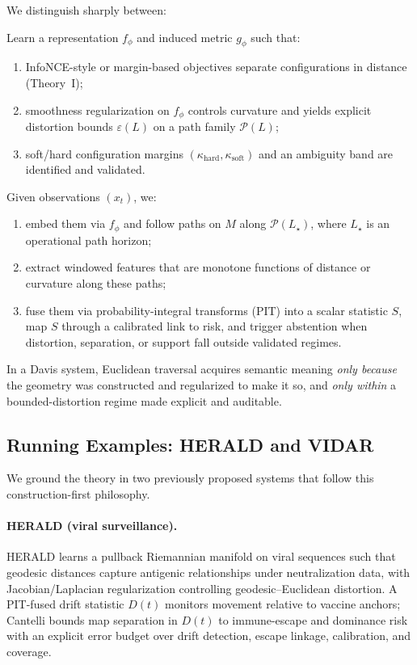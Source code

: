 \documentclass[11pt]{article}
\theoremstyle{remark}
\theoremstyle{plain}
\begin{document}
We distinguish sharply between:
\begin{description}[leftmargin=*,labelsep=0.6em]
    \item[Construction (training time).] Learn a representation $f_\phi$ and induced metric $g_\phi$ such that:
    \begin{enumerate}[leftmargin=1.5em]
        \item InfoNCE-style or margin-based objectives separate configurations in distance (Theory~I);
        \item smoothness regularization on $f_\phi$ controls curvature and yields explicit distortion bounds $\varepsilon(L)$ on a path family $\mathcal{P}(L)$;
        \item soft/hard configuration margins $(\kappa_{\text{hard}}, \kappa_{\text{soft}})$ and an ambiguity band are identified and validated.
    \end{enumerate}
    \item[Traversal (runtime).] Given observations $(x_t)$, we:
    \begin{enumerate}[leftmargin=1.5em]
        \item embed them via $f_\phi$ and follow paths on $M$ along $\mathcal{P}(L_\star)$, where $L_\star$ is an operational path horizon;
        \item extract windowed features that are monotone functions of distance or curvature along these paths;
        \item fuse them via probability-integral transforms (PIT) into a scalar statistic $S$, map $S$ through a calibrated link to risk, and trigger abstention when distortion, separation, or support fall outside validated regimes.
    \end{enumerate}
\end{description}
In a Davis system, Euclidean traversal acquires semantic meaning \emph{only because} the geometry was constructed and regularized to make it so, and \emph{only within} a bounded-distortion regime made explicit and auditable.

\subsection{Running Examples: HERALD and VIDAR}
\label{sec:running-examples}

We ground the theory in two previously proposed systems that follow this construction-first philosophy.

\paragraph{HERALD (viral surveillance).}
HERALD learns a pullback Riemannian manifold on viral sequences such that geodesic distances capture antigenic relationships under neutralization data, with Jacobian/Laplacian regularization controlling geodesic--Euclidean distortion. A PIT-fused drift statistic $D(t)$ monitors movement relative to vaccine anchors; Cantelli bounds map separation in $D(t)$ to immune-escape and dominance risk with an explicit error budget over drift detection, escape linkage, calibration, and coverage.
\end{document}
